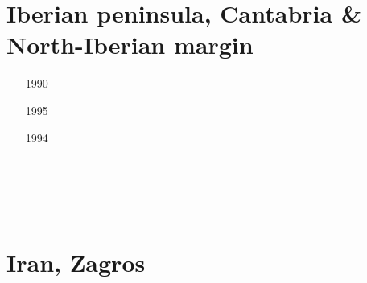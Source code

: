 \section{Iberian peninsula, Cantabria \& North-Iberian margin}

\begin{small}
\begin{itemize}
\item[1990]
\item[1995]
\item[1994]
\item[\nineteenninetysix]
\item[\twothousandtwo]
\item[\twothousandfour]
 \\
\item[\twothousandeleven]
\item[\twothousandfifteen]
 \\
 \\
\item[\twothousandtwentyone]
\item[\twothousandtwentythree]
\end{itemize}
\end{small}

\section{Iran, Zagros} 




